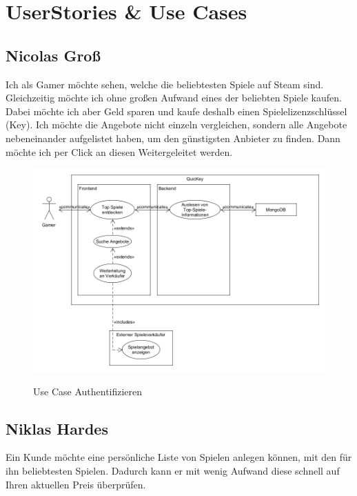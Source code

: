 \section{UserStories \& Use Cases}

\subsection*{Nicolas Groß}

Ich als Gamer möchte sehen, welche die beliebtesten Spiele auf Steam sind. Gleichzeitig möchte ich ohne großen Aufwand eines der beliebten Spiele kaufen. Dabei möchte ich aber Geld sparen und kaufe deshalb einen Spielelizenzschlüssel (Key). Ich möchte die Angebote nicht einzeln vergleichen, sondern alle Angebote nebeneinander aufgelistet haben, um den günstigsten Anbieter zu finden. Dann möchte ich per Click an diesen Weitergeleitet werden.


\begin{figure}[hbt]
    \begin{minipage}[t]{1\textwidth} %
        \caption{Use Case Authentifizieren} %
        \includegraphics[width=1\textwidth]{img/use_case_gamer.png}\\ %
    \end{minipage}
\end{figure}
\newpage
\subsection*{Niklas Hardes}

Ein Kunde möchte eine persönliche Liste von Spielen anlegen können, mit den für ihn beliebtesten Spielen. Dadurch kann er mit wenig Aufwand diese schnell auf Ihren aktuellen Preis überprüfen. 

